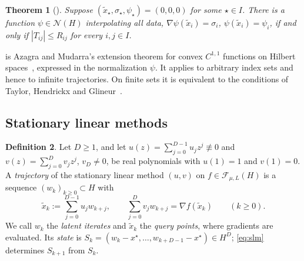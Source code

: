 \documentclass[11pt]{article}
\newtheorem{theorem}{Theorem}[section]
\theoremstyle{definition}
\newtheorem{definition}[theorem]{Definition}
\theoremstyle{remark}
\newcommand{\cF}{\mathcal F}
\newcommand{\cS}{\mathcal N}\newcommand{\Szero}{\mathcal S_0}
\begin{document}
\begin{theorem}[{\cite[Theorem~A.2]{TA}}]\label{thm:interp}
Suppose \((\tilde x_\star,\sigma_\star,\psi_\star)=(0,0,0)\) for some
\(\star\in I\).  There is a function \(\psi\in\cS(H)\) interpolating all data,
\(\nabla\psi(\tilde x_i)=\sigma_i\), \(\psi(\tilde x_i)=\psi_i\), if and only if
\(|T_{ij}|\le R_{ij}\) for every \(i,j\in I\).
\end{theorem}

 is Azagra and Mudarra's extension theorem for convex
\(C^{1,1}\) functions on Hilbert spaces~\cite[Theorem~1.3]{AM17}, expressed
in the normalization \(\psi\).  It applies to arbitrary index sets and hence
to infinite trajectories.  On finite sets it is equivalent to the conditions
of Taylor, Hendrickx and Glineur~\cite{THG17}.

\subsection{Stationary linear methods}

\begin{definition}\label{def:slm}
Let \(D\ge1\), and let \(u(z)=\sum_{j=0}^{D-1}u_jz^j\not\equiv0\) and
\(v(z)=\sum_{j=0}^Dv_jz^j\), \(v_D\neq0\), be real polynomials
with \(u(1)=1\) and \(v(1)=0\).  A \emph{trajectory} of the stationary
linear method \((u,v)\) on \(f\in\cF_{\mu,L}(H)\) is a sequence
\((w_k)_{k\ge0}\subset H\) with
\begin{equation}\label{eq:slm}
\tilde x_k:=\sum_{j=0}^{D-1}u_jw_{k+j},\qquad
\sum_{j=0}^{D}v_jw_{k+j}=\nabla f(\tilde x_k)\qquad(k\ge0).
\end{equation}
We call \(w_k\) the \emph{latent iterates} and \(\tilde x_k\) the \emph{query points},
where gradients are evaluated.  Its \emph{state} is
\(S_k=(w_k-x^\star,\dots,w_{k+D-1}-x^\star)\in H^D\);
\eqref{eq:slm} determines \(S_{k+1}\) from \(S_k\).
\end{definition}
\end{document}
